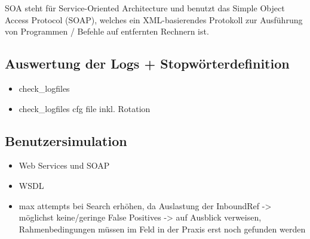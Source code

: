 \gls{SOA} steht für Service-Oriented Architecture und benutzt das Simple Object Access Protocol (\gls{SOAP}), welches ein \gls{XML}-basierendes Protokoll zur Ausführung von Programmen / Befehle auf entfernten Rechnern ist.

\subsection{Auswertung der Logs + Stopwörterdefinition}
\begin{itemize}
\item check\_logfiles
\item check\_logfiles cfg file inkl. Rotation
\end{itemize}

\subsection{Benutzersimulation}
\begin{itemize}
\item Web Services und SOAP
\item WSDL
\item max attempts bei Search erhöhen, da Auslastung der InboundRef -> möglichst keine/geringe False Positives -> auf Ausblick verweisen, Rahmenbedingungen müssen im Feld in der Praxis erst noch gefunden werden
\end{itemize}


